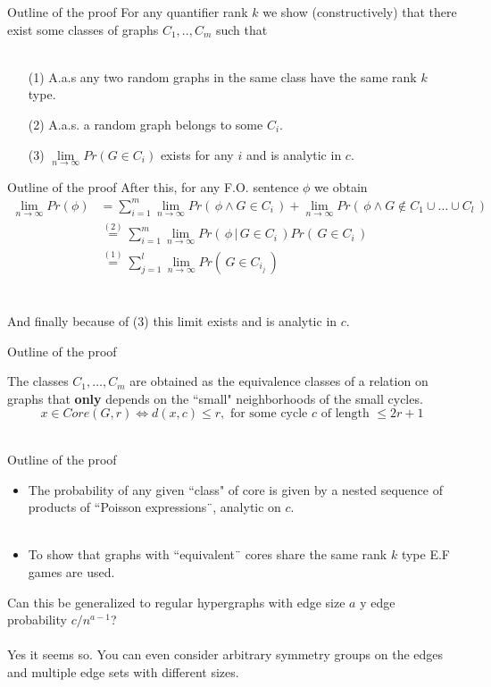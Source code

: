 \documentclass[handout, 11pt]{beamer}
\newcommand{\Ln}{\lim\limits_{n\to \infty}}
\begin{document}
\begin{frame}{Outline of the proof}
	For any quantifier rank $k$ we show (constructively) that there exist
	some classes of graphs $C_1,.., C_m$ such that \\~\\
	\begin{itemize}
		\item[(1)] A.a.s any two random graphs in the same class
		have the same rank $k$ type.
		\item[(2)] A.a.s. a random graph belongs to some $C_i$.
		\item[(3)] $\Ln Pr(G\in C_i)$ exists for any $i$ and is
		analytic in $c$.
	\end{itemize}  
	
\end{frame}
\begin{frame}{Outline of the proof}
	After this, for any F.O. sentence $\phi$ we obtain
	\\
	\begin{align*}
	 \Ln Pr(\phi) &= \sum_{i=1}^{m} \Ln Pr(\, \phi \wedge G\in C_i \,) + 
	  \Ln Pr(\, \phi \wedge G\notin C_1\cup \dots \cup C_l \,) \\
	 & \stackrel{(2)}{=} \sum_{i=1}^{m} \Ln Pr(\, \phi \, |\, G\in C_i \,)Pr( \, G\in C_i \,) \\
	 & \stackrel{(1)}{=} \sum_{j=1}^{l} \Ln Pr(\,G \in C_{i_j} \,)
	\end{align*}
	\\~\\
	And finally because of (3) this limit exists and is analytic in $c$.	
\end{frame}

\begin{frame}{Outline of the proof}

The classes $C_1,\dots, C_m$ are obtained as the equivalence classes
of a relation on graphs that \textbf{only} depends on the ``small" neighborhoods
of the small cycles. \\
\[ x \in  Core(G,r) \iff d(x,c)\leq r , \text{ for some cycle }c \text{ of length 
} \leq 2r+1 \]
~\\


\end{frame}


\begin{frame}{Outline of the proof}
\Large
	\begin{itemize}
		\item The probability of any given ``class" of core is given by
		a nested sequence of products of ``Poisson expressions¨, analytic on $c$.
		\\~\\
		\item To show that graphs with ``equivalent¨ cores share the same 
		rank $k$ type E.F games are used. 
	\end{itemize}
	 
\end{frame}

\begin{frame}
	 \Large
	Can this be generalized to regular hypergraphs with edge size $a$ y
	edge probability $c/n^{a-1}$?\\~\\
	
	Yes it seems so. You can even consider arbitrary symmetry groups on the edges and
	multiple edge sets with different sizes.  
\end{frame}
\end{document}
